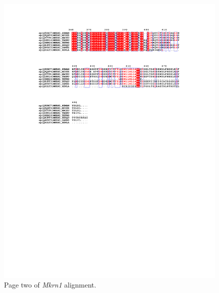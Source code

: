     \newpage
    \begin{figure}
        \includegraphics[width=0.8\linewidth]{images/kumar_alignment_supplement_p2.pdf}
        \caption{Page two of \textit{Mkrn1} alignment.}
        \label{fig:mkrn1_alignment2}
    \end{figure}



    \newpage
